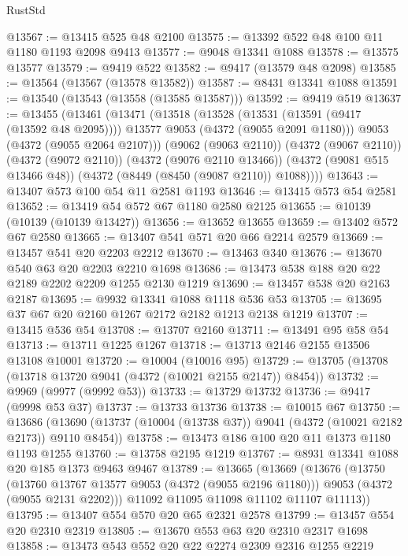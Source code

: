\begin{lexlean}{RustStd}
\begin{coremodule}
@13567 := @13415 @525 @48 @2100
@13575 := @13392 @522 @48 @100 @11 @1180 @1193 @2098 @9413
@13577 := @9048 @13341 @1088
@13578 := @13575 @13577
@13579 := @9419 @522
@13582 := @9417 (@13579 @48 @2098)
@13585 := @13564 (@13567 (@13578 @13582))
@13587 := @8431 @13341 @1088
@13591 := @13540 (@13543 (@13558 (@13585 @13587)))
@13592 := @9419 @519
@13637 := @13455
    (@13461
      (@13471
        (@13518
          (@13528
            (@13531 (@13591 (@9417 (@13592 @48 @2095))))
            @13577
            @9053
            (@4372 (@9055 @2091 @1180)))
          @9053
          (@4372 (@9055 @2064 @2107)))
        (@9062 (@9063 @2110))
        (@4372 (@9067 @2110))
        (@4372 (@9072 @2110))
        (@4372 (@9076 @2110 @13466))
        (@4372 (@9081 @515 @13466 @48))
        (@4372 (@8449 (@8450 (@9087 @2110)) @1088))))
@13643 := @13407 @573 @100 @54 @11 @2581 @1193
@13646 := @13415 @573 @54 @2581
@13652 := @13419 @54 @572 @67 @1180 @2580 @2125
@13655 := @10139 (@10139 (@10139 @13427))
@13656 := @13652 @13655
@13659 := @13402 @572 @67 @2580
@13665 := @13407 @541 @571 @20 @66 @2214 @2579
@13669 := @13457 @541 @20 @2203 @2212
@13670 := @13463 @340
@13676 := @13670 @540 @63 @20 @2203 @2210 @1698
@13686 := @13473 @538 @188 @20 @22 @2189 @2202 @2209 @1255 @2130 @1219
@13690 := @13457 @538 @20 @2163 @2187
@13695 := @9932 @13341 @1088 @1118 @536 @53
@13705 := @13695 @37 @67 @20 @2160 @1267 @2172 @2182 @1213 @2138 @1219
@13707 := @13415 @536 @54
@13708 := @13707 @2160
@13711 := @13491 @95 @58 @54
@13713 := @13711 @1225 @1267
@13718 := @13713 @2146 @2155 @13506 @13108 @10001
@13720 := @10004 (@10016 @95)
@13729 := @13705 (@13708 (@13718 @13720 @9041 (@4372 (@10021 @2155 @2147)) @8454))
@13732 := @9969 (@9977 (@9992 @53))
@13733 := @13729 @13732
@13736 := @9417 (@9998 @53 @37)
@13737 := @13733 @13736
@13738 := @10015 @67
@13750 := @13686
    (@13690 (@13737 (@10004 (@13738 @37)) @9041 (@4372 (@10021 @2182 @2173)) @9110 @8454))
@13758 := @13473 @186 @100 @20 @11 @1373 @1180 @1193 @1255
@13760 := @13758 @2195 @1219
@13767 := @8931 @13341 @1088 @20 @185 @1373 @9463 @9467
@13789 := @13665
    (@13669
      (@13676
        (@13750
          (@13760 @13767 @13577 @9053 (@4372 (@9055 @2196 @1180)))
          @9053
          (@4372 (@9055 @2131 @2202)))
        @11092
        @11095
        @11098
        @11102
        @11107
        @11113))
@13795 := @13407 @554 @570 @20 @65 @2321 @2578
@13799 := @13457 @554 @20 @2310 @2319
@13805 := @13670 @553 @63 @20 @2310 @2317 @1698
@13858 := @13473
    @543
    @552
    @20
    @22
    @2274
    @2309
    @2316
    @1255
    @2219

\end{coremodule}
\end{lexlean}
